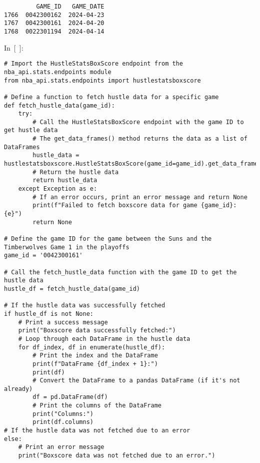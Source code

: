 \begin{verbatim}
         GAME_ID   GAME_DATE
1766  0042300162  2024-04-23
1767  0042300161  2024-04-20
1768  0022301194  2024-04-14
\end{verbatim}

In~{[}~{]}:

\begin{verbatim}
# Import the HustleStatsBoxScore endpoint from the nba_api.stats.endpoints module
from nba_api.stats.endpoints import hustlestatsboxscore

# Define a function to fetch hustle data for a specific game
def fetch_hustle_data(game_id):
    try:
        # Call the HustleStatsBoxScore endpoint with the game ID to get hustle data
        # The get_data_frames() method returns the data as a list of DataFrames
        hustle_data = hustlestatsboxscore.HustleStatsBoxScore(game_id=game_id).get_data_frames()
        # Return the hustle data
        return hustle_data
    except Exception as e:
        # If an error occurs, print an error message and return None
        print(f"Failed to fetch boxscore data for game {game_id}: {e}")
        return None

# Define the game ID for the game between the Suns and the Timberwolves Game 1 in the playoffs
game_id = '0042300161'

# Call the fetch_hustle_data function with the game ID to get the hustle data
hustle_df = fetch_hustle_data(game_id)

# If the hustle data was successfully fetched
if hustle_df is not None:
    # Print a success message
    print("Boxscore data successfully fetched:")
    # Loop through each DataFrame in the hustle data
    for df_index, df in enumerate(hustle_df):
        # Print the index and the DataFrame
        print(f"DataFrame {df_index + 1}:")
        print(df)
        # Convert the DataFrame to a pandas DataFrame (if it's not already)
        df = pd.DataFrame(df)
        # Print the columns of the DataFrame
        print("Columns:")
        print(df.columns)
# If the hustle data was not fetched due to an error
else:
    # Print an error message
    print("Boxscore data was not fetched due to an error.")
\end{verbatim}

